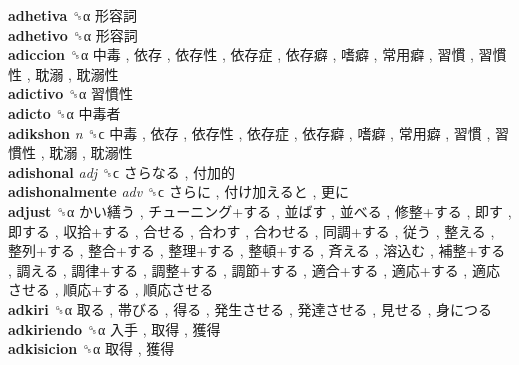 \textbf{adhetiva} ␝α   形容詞   \\
\textbf{adhetivo} ␝α   形容詞   \\
\textbf{adiccion} ␝α   中毒 ,  依存 ,  依存性 ,  依存症 ,  依存癖 ,  嗜癖 ,  常用癖 ,  習慣 ,  習慣性 ,  耽溺 ,  耽溺性   \\
\textbf{adictivo} ␝α   習慣性   \\
\textbf{adicto} ␝α   中毒者   \\
\textbf{adikshon} \emph{n}  ␝ϲ   中毒 ,  依存 ,  依存性 ,  依存症 ,  依存癖 ,  嗜癖 ,  常用癖 ,  習慣 ,  習慣性 ,  耽溺 ,  耽溺性   \\
\textbf{adishonal} \emph{adj}  ␝ϲ   さらなる ,  付加的   \\
\textbf{adishonalmente} \emph{adv}  ␝ϲ   さらに ,  付け加えると ,  更に   \\
\textbf{adjust} ␝α   かい繕う ,  チューニング+する ,  並ばす ,  並べる ,  修整+する ,  即す ,  即する ,  収拾+する ,  合せる ,  合わす ,  合わせる ,  同調+する ,  従う ,  整える ,  整列+する ,  整合+する ,  整理+する ,  整頓+する ,  斉える ,  溶込む ,  補整+する ,  調える ,  調律+する ,  調整+する ,  調節+する ,  適合+する ,  適応+する ,  適応させる ,  順応+する ,  順応させる   \\
\textbf{adkiri} ␝α   取る ,  帯びる ,  得る ,  発生させる ,  発達させる ,  見せる ,  身につる   \\
\textbf{adkiriendo} ␝α   入手 ,  取得 ,  獲得   \\
\textbf{adkisicion} ␝α   取得 ,  獲得   \\
